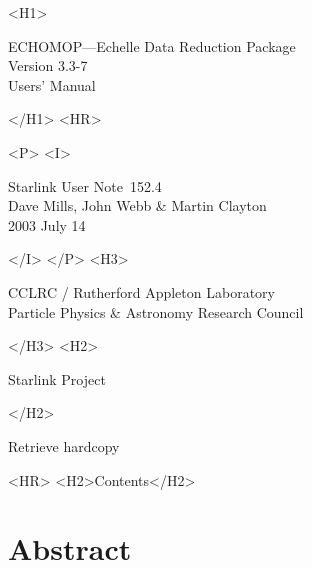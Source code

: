 \documentclass[twoside,11pt]{article}
\newcommand{\stardoccategory}  {Starlink User Note}
\newcommand{\stardocsource}    {sun\stardocnumber}
\newcommand{\stardocnumber}    {152.4}
\newcommand{\stardocauthors}   {Dave Mills, John Webb \& Martin Clayton}
\newcommand{\stardocdate}      {2003 July 14}
\newcommand{\stardoctitle}     {ECHOMOP---Echelle Data Reduction Package}
\newcommand{\stardocversion}   {Version 3.3-7} %
\newcommand{\stardocmanual}    {Users' Manual}
\newcommand{\htmladdnormallink}[2]{#1}
\newcommand{\htmladdimg}[1]{}
\newcommand{\htmlref}[2]{#1}
\newcommand{\htmladdtonavigation}[1]{}
\newcommand{\xlabel}[1]{}
\renewcommand{\_}{\texttt{\symbol{95}}}
\begin{document}
\begin{htmlonly}
   \xlabel{}
   \begin{rawhtml} <H1> \end{rawhtml}
      \stardoctitle\\
      \stardocversion\\
      \stardocmanual
   \begin{rawhtml} </H1> <HR> \end{rawhtml}


   \begin{rawhtml} <P> <I> \end{rawhtml}
   \stardoccategory\ \stardocnumber \\
   \stardocauthors \\
   \stardocdate
   \begin{rawhtml} </I> </P> <H3> \end{rawhtml}
      \htmladdnormallink{CCLRC / Rutherford Appleton Laboratory}
                        {http://www.cclrc.ac.uk} \\
      \htmladdnormallink{Particle Physics \& Astronomy Research Council}
                        {http://www.pparc.ac.uk} \\
   \begin{rawhtml} </H3> <H2> \end{rawhtml}
      \htmladdnormallink{Starlink Project}{http://www.starlink.ac.uk/}
   \begin{rawhtml} </H2> \end{rawhtml}
   \htmladdnormallink{\htmladdimg{source.gif} Retrieve hardcopy}
      {http://www.starlink.ac.uk/cgi-bin/hcserver?\stardocsource}\\

  \label{stardoccontents}
  \begin{rawhtml} 
    <HR>
    <H2>Contents</H2>
  \end{rawhtml}
  \htmladdtonavigation{\htmlref{\htmladdimg{contents_motif.gif}}
        {stardoccontents}}

  \section{\xlabel{abstract}Abstract}
\end{htmlonly}
\end{document}
